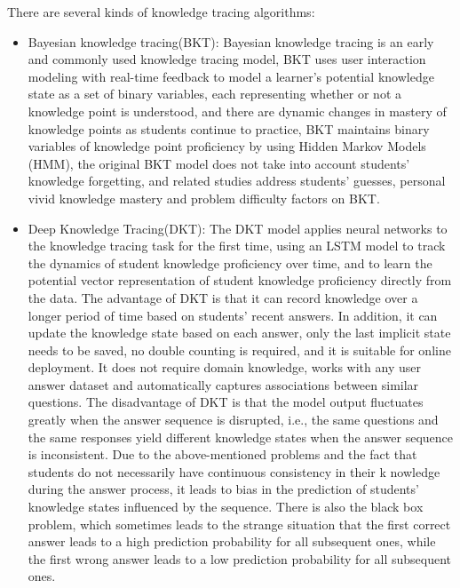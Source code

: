 \documentclass[11pt,en]{elegantpaper}
\begin{document}
There are several kinds of knowledge tracing algorithms: 
\begin{itemize}
	\item Bayesian knowledge tracing(BKT): Bayesian knowledge tracing is an early and commonly used knowledge tracing model, BKT uses user interaction modeling with real-time feedback to model a learner's potential knowledge state as a set of binary variables, each representing whether or not a knowledge point is understood, and there are dynamic changes in mastery of knowledge points as students continue to practice, BKT maintains binary variables of knowledge point proficiency by using Hidden Markov Models (HMM), the original BKT model does not take into account students' knowledge forgetting, and related studies address students' guesses, personal vivid knowledge mastery and problem difficulty factors on BKT\cite{yudelson2013individualized}. 
	\item Deep Knowledge Tracing(DKT): The DKT model applies neural networks to the knowledge tracing task for the first time\cite{piech2015deep}, using an LSTM model to track the dynamics of student knowledge proficiency over time, and to learn the potential vector representation of student knowledge proficiency directly from the data. The advantage of DKT is that it can record knowledge over a longer period of time based on students' recent answers. In addition, it can update the knowledge state based on each answer, only the last implicit state needs to be saved, no double counting is required, and it is suitable for online deployment. It does not require domain knowledge, works with any user answer dataset and automatically captures associations between similar questions. The disadvantage of DKT is that the model output fluctuates greatly when the answer sequence is disrupted, i.e., the same questions and the same responses yield different knowledge states when the answer sequence is inconsistent. Due to the above-mentioned problems and the fact that students do not necessarily have continuous consistency in their k
	nowledge during the answer process, it leads to bias in the prediction of students' knowledge states influenced by the sequence. There is also the black box problem, which sometimes leads to the strange situation that the first correct answer leads to a high prediction probability for all subsequent ones, while the first wrong answer leads to a low prediction probability for all subsequent ones.

\end{itemize}
\end{document}
